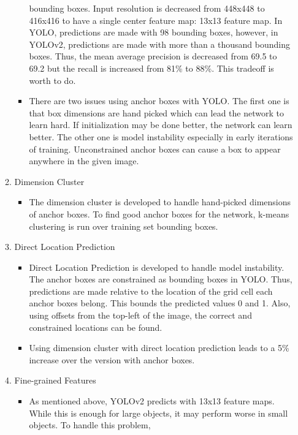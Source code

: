\documentclass{article}
\begin{document}
\begin{enumerate}
\begin{enumerate}
\begin{itemize}
        bounding boxes. Input resolution is decreased from 448x448 to 416x416
        to have a single center feature map: 13x13 feature map. In YOLO, 
        predictions are made with 98 bounding boxes, however, in YOLOv2, 
        predictions are made with more than a thousand bounding boxes.
        Thus, the mean average precision is decreased from 69.5 to 69.2 but 
        the recall is increased from 81\% to 88\%. This tradeoff is worth to do.
            \item There are two issues using anchor boxes with YOLO. The first 
        one is that box dimensions are hand picked which can lead the network 
        to learn hard. If initialization may be done better, the network can learn 
        better. The other one is model instability especially in early iterations 
        of training. Unconstrained anchor boxes can cause a box to appear anywhere 
        in the given image.
        \end{itemize}
        \item Dimension Cluster
        \begin{itemize}
            \item The dimension cluster is developed to handle hand-picked dimensions
        of anchor boxes. To find good anchor boxes for the network, k-means clustering is run 
        over training set bounding boxes. 
        \end{itemize}
        \item Direct Location Prediction
        \begin{itemize}
            \item Direct Location Prediction is developed to handle model instability. 
        The anchor boxes are constrained as bounding boxes in YOLO. Thus, predictions 
        are made relative to the location of the grid cell each anchor boxes belong. This 
        bounds the predicted values 0 and 1. Also, using offsets from the top-left of the image, the 
        correct and constrained locations can be found. 
            \item Using dimension cluster with direct location prediction leads to a 5\% increase 
        over the version with anchor boxes.
        \end{itemize}
        \item Fine-grained Features
        \begin{itemize}
            \item As mentioned above, YOLOv2 predicts with 13x13 feature maps. While this is 
        enough for large objects, it may perform worse in small objects. To handle this problem, 

\end{itemize}
\end{enumerate}
\end{enumerate}
\end{document}
